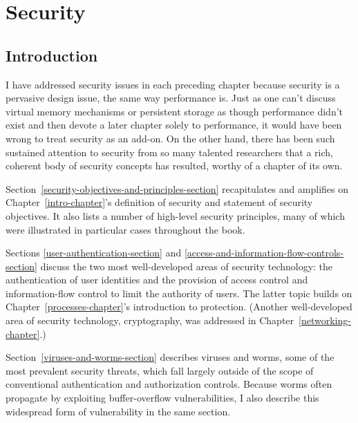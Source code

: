 \chapter{Security}
\label{security-chapter}

\section{Introduction}

I have addressed security issues in each preceding chapter because
security is a pervasive design issue, the same way performance is.
Just as one can't discuss virtual memory mechanisms or persistent
storage as though performance didn't exist and then devote a later
chapter solely to performance, it would have been wrong to treat
security as an add-on.  On the other hand, there has been such
sustained attention to security from so many talented researchers that
a rich, coherent body of security concepts has resulted, worthy of a
chapter of its own.

Section~\ref{security-objectives-and-principles-section} recapitulates
and amplifies on Chapter~\ref{intro-chapter}'s definition of security and
statement of security objectives.  It also lists a number of
high-level security principles, many of which were illustrated in
particular cases throughout the book.

Sections \ref{user-authentication-section} and
\ref{access-and-information-flow-controls-section} discuss the two
most well-developed areas of security technology: the authentication
of user identities and the provision of access control and
information-flow control to limit the authority of users.  The latter
topic builds on Chapter~\ref{processes-chapter}'s introduction to
protection.  (Another well-developed area of security technology,
cryptography, was addressed in Chapter~\ref{networking-chapter}.)

Section~\ref{viruses-and-worms-section} describes viruses and worms,
some of the most prevalent security threats, which fall largely
outside of the scope of conventional authentication and authorization
controls.  Because worms often propagate by exploiting buffer-overflow
vulnerabilities, I also describe this widespread form of vulnerability
in the same section.

